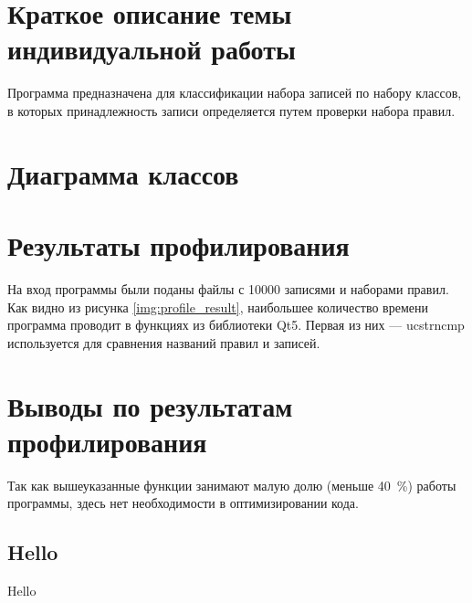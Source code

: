 \section{Краткое описание темы индивидуальной работы}
Программа предназначена для классификации набора записей по набору классов, в 
которых принадлежность записи определяется путем проверки набора правил.

\section{Диаграмма классов}

\section{Результаты профилирования}
На вход программы были поданы файлы с 10000 записями и наборами правил. Как видно из рисунка \ref{img:profile_result}, наибольшее количество времени программа проводит в функциях из библиотеки Qt5. Первая из них — ucstrncmp используется для сравнения названий правил и записей.

\section{Выводы по результатам профилирования}
Так как вышеуказанные функции занимают малую долю (меньше 40 \%) работы программы, здесь нет необходимости в оптимизировании кода.

\subsection{Hello}
Hello
